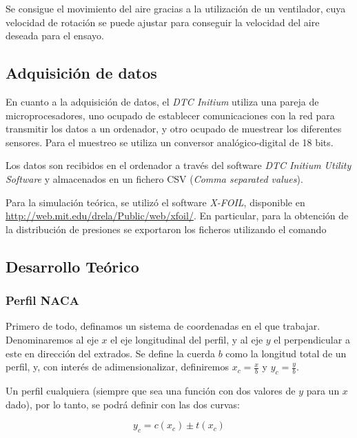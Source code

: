 \documentclass{article}
\begin{document}
Se consigue el movimiento del aire gracias a la utilización de un ventilador, cuya velocidad de rotación se puede ajustar
para conseguir la velocidad del aire deseada para el ensayo.

\subsection{Adquisición de datos}

En cuanto a la adquisición de datos, el \textit{DTC Initium} utiliza una pareja de microprocesadores, uno ocupado de establecer
comunicaciones con la red para transmitir los datos a un ordenador, y otro ocupado de muestrear los diferentes sensores. 
Para el muestreo se utiliza un conversor analógico-digital de 18 bits. 

Los datos son recibidos en el ordenador a través del software \textit{DTC Initium Utility Software} y almacenados en un fichero
CSV (\textit{Comma separated values}). 

Para la simulación teórica, se utilizó el software \textit{X-FOIL}, disponible en \url{http://web.mit.edu/drela/Public/web/xfoil/}.
En particular, para la obtención de la distribución de presiones se exportaron los ficheros utilizando el comando

\subsection{Desarrollo Teórico}

\subsubsection{Perfil NACA}

Primero de todo, definamos un sistema de coordenadas en el que trabajar. Denominaremos al eje $x$ el eje longitudinal
del perfil, y al eje $y$ el perpendicular a este en dirección del extrados. Se define la cuerda $b$ como la longitud total
de un perfil, y, con interés de adimensionalizar, definiremos $x_c = \frac{x}{b}$ y $y_c = \frac{y}{b}$.

Un perfil cualquiera (siempre que sea una función con dos valores de $y$ para un $x$ dado), por lo tanto, se podrá definir 
con las dos curvas:

$$y_c = c(x_c) \pm t(x_c)$$
\end{document}
